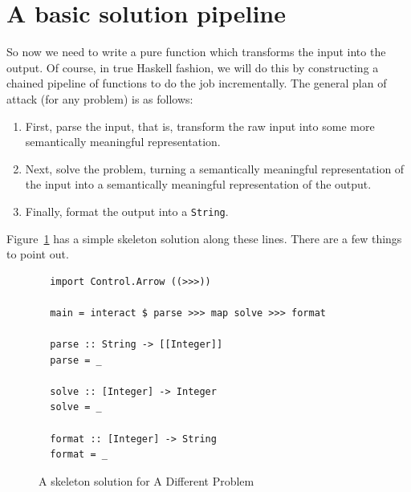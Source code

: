 \documentclass{book}
\newcommand{\h}[1]{\texttt{#1}}
\begin{document}
\section{A basic solution pipeline}
\label{sec:pipeline}

So now we need to write a pure function which transforms the input
into the output.  Of course, in true Haskell fashion, we will do this
by constructing a chained pipeline of functions to do the job
incrementally.  The general plan of attack (for any problem) is
as follows:
\begin{enumerate}
\item First, parse the input, that is, transform the raw input
  into some more semantically meaningful representation.
\item Next, solve the problem, turning a semantically meaningful
  representation of the input into a semantically meaningful
  representation of the output.
\item Finally, format the output into a \h{String}.
\end{enumerate}
Figure~\ref{fig:skeleton-different} has a simple skeleton solution along
these lines. There are a few things to point out.

\begin{figure}
  \centering
\begin{verbatim}
  import Control.Arrow ((>>>))

  main = interact $ parse >>> map solve >>> format

  parse :: String -> [[Integer]]
  parse = _

  solve :: [Integer] -> Integer
  solve = _

  format :: [Integer] -> String
  format = _
\end{verbatim}
  \caption{A skeleton solution for A Different Problem}
  \label{fig:skeleton-different}
\end{figure}
\end{document}
